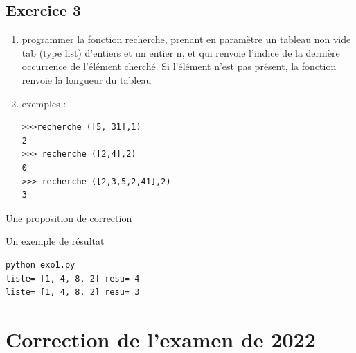 \documentclass[a4paper,12pt]{article}
\begin{document}
\subsection{Exercice 3}
\begin{leftbar}
\begin{enumerate}
\item programmer la fonction recherche, prenant en param\`etre un tableau non vide tab (type list) d'entiers et un entier n, et qui renvoie l'indice de la derni\`ere occurrence de l'\'el\'ement cherch\'e. Si l'\'el\'ement n'est pas pr\'esent, la fonction renvoie la longueur du tableau
\item exemples :
\begin{verbatim}
>>>recherche ([5, 31],1)
2
>>> recherche ([2,4],2)
0
>>> recherche ([2,3,5,2,41],2)
3
\end{verbatim}
\end{enumerate}
\end{leftbar}
Une proposition de correction

Un exemple de r\'esultat
\begin{verbatim}
python exo1.py 
liste= [1, 4, 8, 2] resu= 4
liste= [1, 4, 8, 2] resu= 3
\end{verbatim}



\clearpage
\section{Correction de l’examen de 2022}
\end{document}
